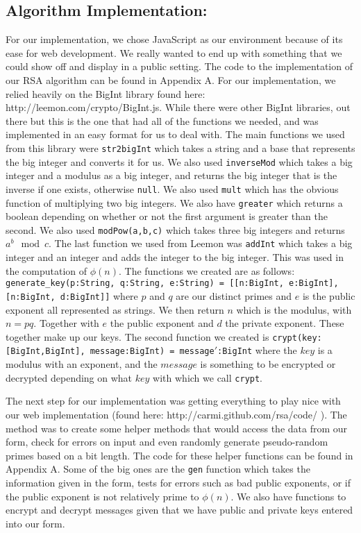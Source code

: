 \documentclass[11pt,twoside]{article}
\newcommand{\ty}[1]{\texttt{#1}}
\begin{document}
\begin{multicols}{2}
\section{Algorithm Implementation:}
For our implementation, we chose JavaScript as our environment because of its
ease for web development. We really wanted to end up with something that we
could show off and display in a public setting. The code to the implementation
of our RSA algorithm can be found in Appendix A. For our implementation, we
relied heavily on the BigInt library found here: 
http://leemon.com/crypto/BigInt.js.
While there were other BigInt libraries, out there but this is the one that had
all of the functions we needed, and was implemented in an easy format for us to
deal with. The main functions we used from this library were \ty{str2bigInt}
which takes a string and a base that represents the big integer and converts it
for us. We also used \ty{inverseMod} which takes a big integer and a modulus as
a big integer, and returns the big integer that is the inverse if one exists,
otherwise \ty{null}. We also used \ty{mult} which has the obvious function of
multiplying two big integers. We also have \ty{greater} which returns a boolean
depending on whether or not the first argument is greater than the second. We
also used \ty{modPow(a,b,c)} which takes three big integers and returns $a^b
\mod c$.  
The last function we used from Leemon was \ty{addInt} which takes a big integer
and an integer and adds the integer to the big integer. This was used in the
computation of $\phi(n)$. The functions we created are as follows:
\ty{generate\_key(p:String, q:String, e:String) = [[n:BigInt, e:BigInt],
[n:BigInt, d:BigInt]]} where $p$ and $q$ are our distinct primes and $e$ is the
public exponent all represented as strings. We then return $n$ which is the
modulus, with $n = pq$. Together with $e$ the public exponent and $d$ the
private exponent. These together make up our keys. The second function we
created is \ty{crypt(key:[BigInt,BigInt], message:BigInt) = message$'$:BigInt}
where the $key$ is a modulus with an exponent, and the $message$ is something to
be encrypted or decrypted depending on what $key$ with which we call \ty{crypt}.

The next step for our implementation was getting everything to play nice with
our web implementation (found here: http://carmi.github.com/rsa/code/ ). The 
method was to create some helper methods that would access the data from our 
form, check for errors on input and
even randomly generate pseudo-random primes based on a bit length. The code for
these helper functions can be found in Appendix A. Some of the big ones are the
\ty{gen} function which takes the information given in the form, tests for
errors such as bad public exponents, or if the public exponent is not relatively
prime to $\phi(n)$. We also have functions to encrypt and decrypt messages given
that we have public and private keys entered into our form.


\end{multicols}
\end{document}
